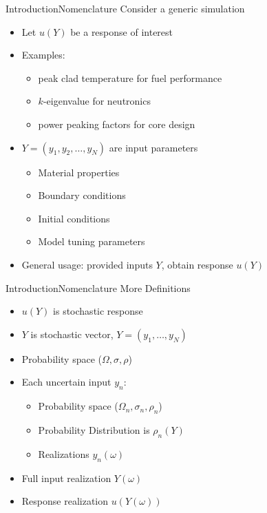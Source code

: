 \documentclass{beamer}
\begin{document}
\begin{frame}{Introduction}{Nomenclature}\vspace{-10pt}
  Consider a generic simulation
  \begin{itemize}
    \item Let $u(Y)$ be a response of interest
    \item Examples:
      \begin{itemize}
        \item peak clad temperature for fuel performance
        \item $k$-eigenvalue for neutronics
        \item power peaking factors for core design
      \end{itemize}
    \item $Y=(y_1,y_2,\ldots,y_N)$ are input parameters
      \begin{itemize}
        \item Material properties
        \item Boundary conditions
        \item Initial conditions
        \item Model tuning parameters
      \end{itemize}
    \item General usage: provided inputs $Y$, obtain response $u(Y)$
  \end{itemize}
\end{frame}



\begin{frame}{Introduction}{Nomenclature}\vspace{-10pt}
  More Definitions
  \vfill
  \begin{itemize}
    \item $u(Y)$ is stochastic response
  \vfill
\item $Y$ is stochastic vector, $Y=(y_1,\ldots,y_N)$
    \item Probability space ($\Omega,\sigma,\rho$)
  \vfill
    \item Each uncertain input $y_n$:
      \begin{itemize}
        \item Probability space ($\Omega_n,\sigma_n,\rho_n$)
        \item Probability Distribution is $\rho_n(Y)$
        \item Realizations $y_n(\omega)$
      \end{itemize}
    \item Full input realization $Y(\omega)$
    \item Response realization $u(Y(\omega))$
  \end{itemize}
  \vfill
\end{frame}
\end{document}
